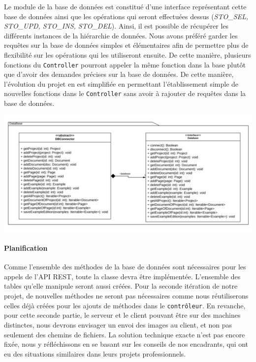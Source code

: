 Le module de la base de données est constitué d'une interface représentant cette base de données ainsi que les opérations qui seront effectuées dessus (\textit{STO\_SEL, STO\_UPD, STO\_INS, STO\_DEL}). Ainsi, il est possible de récupérer les différents instances de la hiérarchie de données. Nous avons préféré garder les requêtes sur la base de données simples et élémentaires afin de permettre plus de flexibilité sur les opérations qui les utiliseront ensuite. De cette manière, plusieurs fonctions du \texttt{Controller} pourront appeler la même fonction dans la base plutôt que d'avoir des demandes précises sur la base de données. De cette manière, l'évolution du projet en est simplifiée en permettant l'établissement simple de nouvelles fonctions dans le \texttt{Controller} sans avoir à rajouter de requêtes dans la base de données.

\begin{mdframed}[frametitle={Figure 9 : Architecture de la base de données}, innerbottommargin=10]
\begin{center}
\includegraphics[scale=0.5]{assets/UML_Database.pdf}
\end{center}
\end{mdframed}

\paragraph{Planification}
Comme l'ensemble des méthodes de la base de données sont nécessaires pour les appels de l'API REST, toute la classe devra être implémentée. L'ensemble des tables qu'elle manipule seront aussi créées. Pour la seconde itération de notre projet, de nouvelles méthodes ne seront pas nécessaires comme nous réutiliserons celles déjà créées pour les ajouts de méthodes dans le \texttt{contrôleur}. En revanche, pour cette seconde partie, le serveur et le client pouvant être sur des machines distinctes, nous devrons envisager un envoi des images au client, et non pas seulement des chemins de fichiers. La solution technique exacte n'est pas encore fixée, nous y réfléchissons en se basant sur les conseils de nos encadrants, qui ont eu des situations similaires dans leurs projets professionnels.

